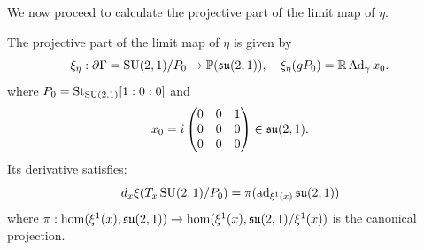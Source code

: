 \documentclass{report}
\begin{document}
We now proceed to calculate the projective part of the limit map of $\eta$.
\begin{proposition}\label{prop:counterexample_limit_map}
    The projective part of the limit map of $\eta$ is given by
    \[
        \xi_\eta: \partial \Gamma = \operatorname{{\mathrm{SU}}}(2,1)/P_0 \to \mathbb P(\mathfrak{su}(2,1)), \quad \xi_\eta(g P_0) = \mathbb R \operatorname{Ad}_{\gamma} x_0.
    \]
    where  $P_0 = \mathrm{St}_{\operatorname{{\mathrm{SU}}}(2,1)} [1:0:0]$ and 
    \[
    x_0 = i \begin{pmatrix} 0 & 0 & 1 \\ 0 & 0 & 0 \\ 0 & 0 & 0 \end{pmatrix} \in \operatorname{{\mathfrak{su}}}(2,1).
    \]
    Its derivative satisfies: 
    \[
    d_x \xi(T_x \operatorname{{\mathrm{SU}}}(2,1)/P_0) = \pi(\operatorname{ad}_{\xi^1(x)} \operatorname{{\mathfrak{su}}}(2,1))
    \]
    where $\pi : \hom (\xi^1(x), \operatorname{{\mathfrak{su}}}(2,1)) \to \hom(\xi^1(x), \operatorname{{\mathfrak{su}}}(2,1)/ \xi^1(x))$ is the canonical projection.
\end{proposition}
\end{document}
